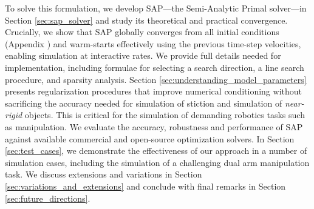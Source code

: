 To solve this formulation, we develop SAP---the Semi-Analytic Primal solver---in
Section \ref{sec:sap_solver} and study its theoretical and practical
convergence.  Crucially, we show that SAP globally converges from all initial
conditions (Appendix ) and warm-starts effectively
using the previous time-step velocities, enabling simulation at interactive rates.
We provide full details needed for implementation,
including formulae for selecting a search direction,
a line search procedure, and sparsity analysis. Section
\ref{sec:understanding_model_parameters} presents 
regularization procedures that improve numerical
conditioning without sacrificing the accuracy needed
for simulation of stiction and simulation of \emph{near-rigid} objects.
This is critical for the simulation of demanding robotics tasks such as
manipulation. We evaluate the accuracy, robustness and performance of SAP
against available commercial and open-source optimization solvers. In Section
\ref{sec:test_cases}, we demonstrate the effectiveness of our approach in a
number of simulation cases, including the simulation of a challenging dual arm
manipulation task. We discuss extensions and variations in Section
\ref{sec:variations_and_extensions} and conclude with final remarks in Section
\ref{sec:future_directions}.
